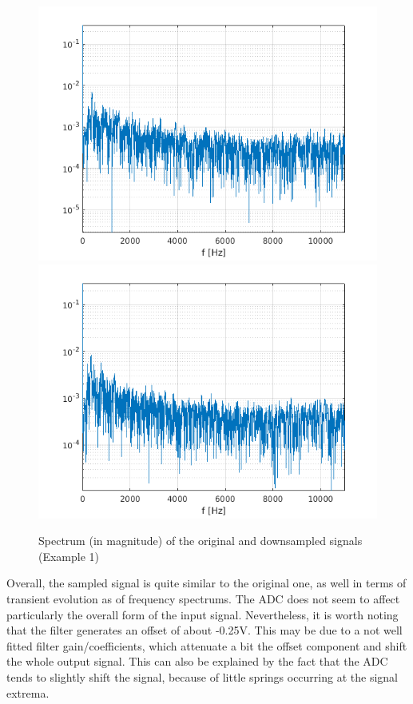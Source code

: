 \begin{figure}[!h]
{\begin{minipage}{\linewidth}
			\includegraphics[scale=0.45]{images/DownsamplingCircuit/outLFFT.png}
			\includegraphics[scale=0.45]{images/DownsamplingCircuit/outRFFT.png}
		\end{minipage}
	}%
	\caption{Spectrum (in magnitude) of the original and downsampled signals (Example 1)}%
	\label{fig:downsamplingWavEx1Spectrum}%
\end{figure}

Overall, the sampled signal is quite similar to the original one, as well in terms of transient evolution as of frequency spectrums. The ADC does not seem to affect particularly the overall form of the input signal. Nevertheless, it is worth noting that the filter generates an offset of about -0.25V. This may be due to a not well fitted filter gain/coefficients, which attenuate a bit the offset component and shift the whole output signal. This can also be explained by the fact that the ADC tends to slightly shift the signal, because of little springs occurring at the signal extrema.